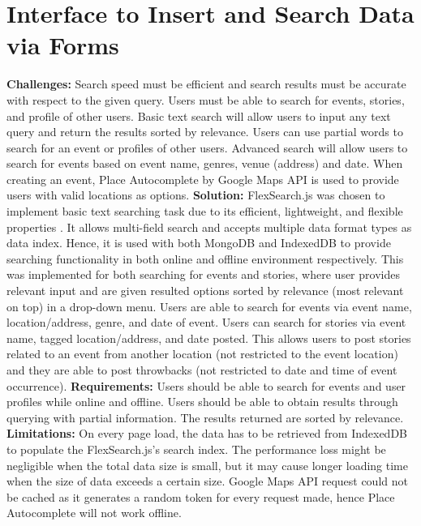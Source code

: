 \documentclass[11pt, a4paper]{article}
\begin{document}
\section{Interface to Insert and Search Data via Forms}
\textbf{Challenges:} Search speed must be efficient and search results must be accurate with respect
to the given query. Users must be able to search for events, stories, and profile of other users.
Basic text search will allow users to input any text query and return the results sorted by
relevance. Users can use partial words to search for an event or profiles of other users.
Advanced search will allow users to search for events based on event name, genres, venue (address)
and date. When creating an event, Place Autocomplete by Google Maps API \cite{google_maps_api} is
used to provide users with valid locations as options. \textbf{Solution:} FlexSearch.js
\cite{flexsearch} was chosen to implement basic text searching task due to its efficient,
lightweight, and flexible properties \cite{flexsearch_benchmarkk}. It allows multi-field search and
accepts multiple data format types as data index. Hence, it is used with both MongoDB and IndexedDB
to provide searching functionality in both online and offline environment respectively. This was
implemented for both searching for events and stories, where user provides relevant input and
are given resulted options sorted by relevance (most relevant on top) in a drop-down menu.
Users are able to search for events via event name, location/address, genre, and date of event.
Users can search for stories via event name, tagged location/address, and date posted. This allows
users to post stories related to an event from another location (not restricted to the event
location) and they are able to post throwbacks (not restricted to date and time of event occurrence).
\textbf{Requirements:} Users should be able to search for events and user profiles while online and
offline. Users should be able to obtain results through querying with partial information. The
results returned are sorted by relevance. \textbf{Limitations:} On every page load, the data has to
be retrieved from IndexedDB to populate the FlexSearch.js's search index. The performance loss might
be negligible when the total data size is small, but it may cause longer loading time when the size
of data exceeds a certain size. Google Maps API request could not be cached as it generates a random
token for every request made, hence Place Autocomplete will not work offline.
\end{document}
